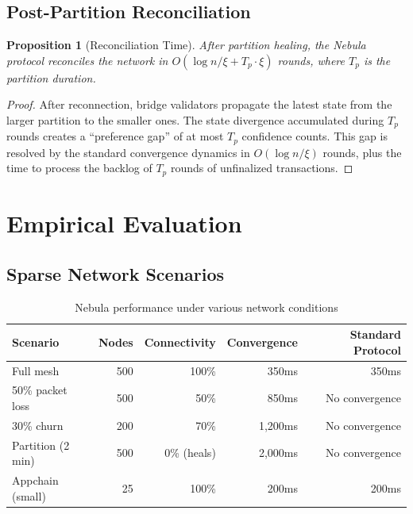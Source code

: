 \documentclass[11pt,a4paper]{article}
\newtheorem{proposition}[theorem]{Proposition}
\begin{document}
\subsection{Post-Partition Reconciliation}

\begin{proposition}[Reconciliation Time]
\label{prop:reconciliation}
After partition healing, the Nebula protocol reconciles the network in $O(\log n / \xi + T_p \cdot \xi)$
rounds, where $T_p$ is the partition duration.
\end{proposition}

\begin{proof}
After reconnection, bridge validators propagate the latest state from the larger
partition to the smaller ones. The state divergence accumulated during $T_p$ rounds
creates a ``preference gap'' of at most $T_p$ confidence counts. This gap is resolved
by the standard convergence dynamics in $O(\log n / \xi)$ rounds, plus the time to
process the backlog of $T_p$ rounds of unfinalized transactions.
\end{proof}

\section{Empirical Evaluation}
\label{sec:evaluation}

\subsection{Sparse Network Scenarios}

\begin{table}[h]
\centering
\begin{tabular}{@{}lrrrr@{}}
\toprule
\textbf{Scenario} & \textbf{Nodes} & \textbf{Connectivity} & \textbf{Convergence} & \textbf{Standard Protocol} \\
\midrule
Full mesh & 500 & 100\% & 350ms & 350ms \\
50\% packet loss & 500 & 50\% & 850ms & No convergence \\
30\% churn & 200 & 70\% & 1,200ms & No convergence \\
Partition (2 min) & 500 & 0\% (heals) & 2,000ms & No convergence \\
Appchain (small) & 25 & 100\% & 200ms & 200ms \\
\bottomrule
\end{tabular}
\caption{Nebula performance under various network conditions}
\label{tab:nebula-results}
\end{table}
\end{document}
